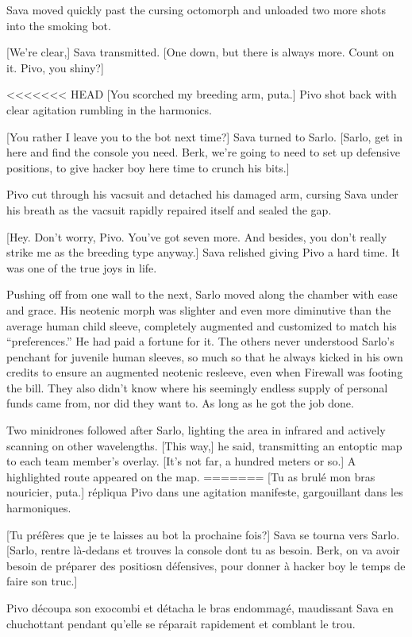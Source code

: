 Sava moved quickly past the cursing octomorph and unloaded two more shots into the smoking bot. 

[We're clear,] Sava transmitted. [One down, but there is always more. Count on it. Pivo, you shiny?] 

<<<<<<< HEAD
[You scorched my breeding arm, puta.] Pivo shot back with clear agitation rumbling in the harmonics. 

[You rather I leave you to the bot next time?] Sava turned to Sarlo. [Sarlo, get in here and find the console you need. Berk, we're going to need to set up defensive positions, to give hacker boy here time to crunch his bits.] 

Pivo cut through his vacsuit and detached his damaged arm, cursing Sava under his breath as the vacsuit rapidly repaired itself and sealed the gap. 

[Hey. Don't worry, Pivo. You've got seven more. And besides, you don't really strike me as the breeding type anyway.] Sava relished giving Pivo a hard time. It was one of the true joys in life. 

Pushing off from one wall to the next, Sarlo moved along the chamber with ease and grace. His neotenic morph was slighter and even more diminutive than the average human child sleeve, completely augmented and customized to match his ``preferences.'' He had paid a fortune for it. The others never understood Sarlo's penchant for juvenile human sleeves, so much so that he always kicked in his own credits to ensure an augmented neotenic resleeve, even when Firewall was footing the bill. They also didn't know where his seemingly endless supply of personal funds came from, nor did they want to. As long as he got the job done. 

Two minidrones followed after Sarlo, lighting the area in infrared and actively scanning on other wavelengths. [This way,] he said, transmitting an entoptic map to each team member's overlay. [It's not far, a hundred meters or so.] A highlighted route appeared on the map. 
=======
[Tu as brulé mon bras nouricier, puta.] répliqua Pivo dans une agitation manifeste, gargouillant dans les harmoniques. 

[Tu préfères que je te laisses au bot la prochaine fois?] Sava se tourna vers Sarlo. [Sarlo, rentre là-dedans et trouves la console dont tu as besoin. Berk, on va avoir besoin de préparer des positiosn défensives, pour donner à hacker boy le temps de faire son truc.] 

Pivo découpa son exocombi et détacha le bras endommagé, maudissant Sava en chuchottant pendant qu'elle se réparait rapidement et comblant le trou. 

